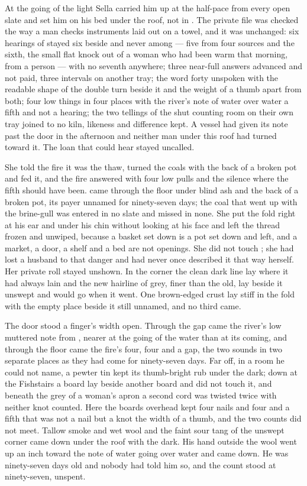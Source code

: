 At the going of the light Sella carried him up  at the half-pace from every open slate and set him on his bed under the  roof, not in . The private file was checked the way a man checks instruments laid out on a towel, and it was unchanged: six hearings of  stayed six beside and never among --- five from four sources and the sixth, the small flat knock out of a woman who had been warm that morning, from a person --- with no seventh anywhere; three near-full answers advanced and not paid, three intervals on another tray; the word forty unspoken with the readable shape of the double turn beside it and the weight of a thumb apart from both; four low things in four places with the river's note of water over water a fifth and not a hearing; the two tellings of the shut counting room on their own tray joined to no kiln, likeness and difference kept. A vessel had given its note past the door in the afternoon and neither man under this roof had turned toward it. The loan that could hear stayed uncalled.

She told the fire it was the thaw, turned the coals with the back of a broken pot and fed it, and the fire answered with four low pulls and the silence where the fifth should have been.  came through the floor under blind ash and the back of a broken pot, its payer unnamed for ninety-seven days; the coal that went up with the brine-gull was entered in no slate and missed in none. She put the fold right at his ear and under his chin without looking at his face and left the thread frozen and unwiped, because a basket set down is a pot set down and left, and a market, a door, a shelf and a bed are not openings. She did not touch ; she had lost a husband to that danger and had never once described it that way herself. Her private roll stayed unshown. In the corner the clean dark line lay where it had always lain and the new hairline of grey, finer than the old, lay beside it unswept and would go when it went. One brown-edged crust lay stiff in the fold with the empty place beside it still unnamed, and no third came.

The door stood a finger's width open. Through the gap came the river's low muttered note from , nearer at the going of the water than at its coming, and through the floor came the fire's four, four and a gap, the two sounds in two separate places as they had come for ninety-seven days. Far off, in a room he could not name, a pewter tin kept its thumb-bright rub under the dark; down at the Fishstairs a board lay beside another board and did not touch it, and beneath the grey of a woman's apron a second cord was twisted twice with neither knot counted. Here the boards overhead kept four nails and four and a fifth that was not a nail but a knot the width of a thumb, and the two counts did not meet. Tallow smoke and wet wool and the faint sour tang of the unswept corner came down under the roof with the dark. His hand outside the wool went up an inch toward the note of water going over water and came down. He was ninety-seven days old and nobody had told him so, and the count stood at ninety-seven, unspent.
